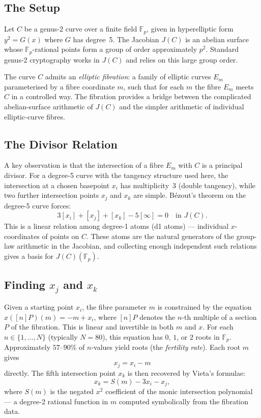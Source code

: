 \documentclass[11pt]{article}
\theoremstyle{definition}
\theoremstyle{remark}
\newcommand{\Fp}{\mathbb{F}_p}
\begin{document}
\subsection{The Setup}

Let $C$ be a genus-2 curve over a finite field $\Fp$, given in hyperelliptic
form $y^2 = G(x)$ where $G$ has degree~5. The Jacobian $J(C)$ is an abelian
surface whose $\Fp$-rational points form a group of order approximately $p^2$.
Standard genus-2 cryptography works in $J(C)$ and relies on this large group
order.

The curve $C$ admits an \emph{elliptic fibration}: a family of elliptic curves
$E_m$ parameterised by a fibre coordinate $m$, such that for each $m$ the fibre
$E_m$ meets $C$ in a controlled way. The fibration provides a bridge between the
complicated abelian-surface arithmetic of $J(C)$ and the simpler arithmetic of
individual elliptic-curve fibres.

\subsection{The Divisor Relation}

A key observation is that the intersection of a fibre $E_m$ with $C$ is a
principal divisor. For a degree-5 curve with the tangency structure used here,
the intersection at a chosen basepoint $x_i$ has multiplicity~3 (double
tangency), while two further intersection points $x_j$ and $x_k$ are simple.
Bézout's theorem on the degree-5 curve forces:
\begin{equation}
  \label{eq:divisor}
  3[x_i] + [x_j] + [x_k] - 5[\infty] = 0 \quad \text{in } J(C).
\end{equation}
This is a linear relation among degree-1 atoms (d1 atoms) — individual
$x$-coordinates of points on $C$. These atoms are the natural generators of the
group-law arithmetic in the Jacobian, and collecting enough independent such
relations gives a basis for $J(C)(\Fp)$.

\subsection{Finding $x_j$ and $x_k$}

Given a starting point $x_i$, the fibre parameter $m$ is constrained by the
equation $x([n]P)(m) = -m + x_i$, where $[n]P$ denotes the $n$-th multiple of
a section $P$ of the fibration. This is linear and invertible in both $m$ and
$x$. For each $n \in \{1,\ldots,N\}$ (typically $N = 80$), this equation has
$0$, $1$, or $2$ roots in $\Fp$. Approximately $57$--$90\%$ of $n$-values yield
roots (the \emph{fertility rate}). Each root $m$ gives
\[
  x_j = x_i - m
\]
directly. The fifth intersection point $x_k$ is then recovered by Vieta's
formulae:
\begin{equation}
  \label{eq:vieta}
  x_k = S(m) - 3x_i - x_j,
\end{equation}
where $S(m)$ is the negated $x^2$ coefficient of the monic intersection
polynomial — a degree-2 rational function in $m$ computed symbolically from
the fibration data.
\end{document}
